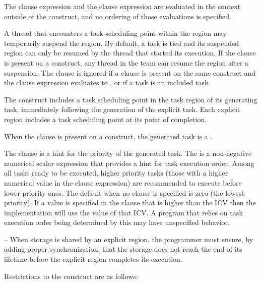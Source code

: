 The  clause expression and the  clause expression are evaluated in the context 
outside of the  construct, and no ordering of those evaluations is specified.

A thread that encounters a task scheduling point within the  region may 
temporarily suspend the  region. By default, a task is tied and its suspended  
region can only be resumed by the thread that started its execution. If the  
clause is present on a  construct, any thread in the team can resume the  
region after a suspension. The  clause is ignored if a  clause is present 
on the same  construct and the  clause expression evaluates to , or if a 
task is an included task.

The  construct includes a task scheduling point in the task region of its generating 
task, immediately following the generation of the explicit task. Each explicit  
region includes a task scheduling point at its point of completion. 

When the  clause is present on a  construct, the generated task is a . 

The  clause is a hint for the priority of the generated task. The  is a
non-negative numerical scalar expression that provides a hint for task execution order. Among all
tasks ready to be executed, higher priority tasks (those with a higher numerical value in the
 clause expression) are recommended to execute before lower priority ones. The default
 when no  clause is specified is zero (the lowest priority). If a value is
specified in the  clause that is higher than the  ICV then the
implementation will use the value of that ICV. A program that relies on task execution order
being determined by this  may have unspecified behavior.

\notestart
\noteheader – When storage is shared by an explicit  region, the 
programmer must ensure, by adding proper synchronization, that the storage does not 
reach the end of its lifetime before the explicit  region completes its execution.
\noteend

\restrictions
Restrictions to the  construct are as follows:

